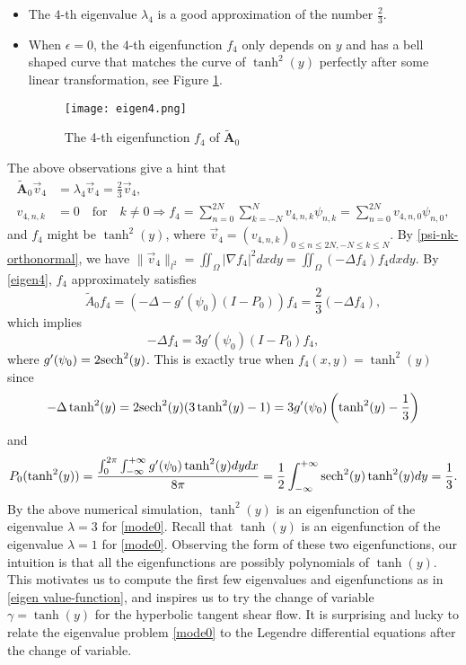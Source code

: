 \documentclass[1 [leqno, 11pt]{amsart}
\numberwithin{equation}{section}
\def\sech{{\rm{sech}}}
\begin{document}
\begin{CJK*}{GBK}{song}
\begin{itemize}
\item The $4$-th eigenvalue $\lambda_4$ is a good approximation of the number $\frac 2 3$.
\item When $\epsilon = 0$, the $4$-th eigenfunction $f_4$ only depends on $y$ and has a bell shaped curve that matches the curve of $\tanh^2(y)$ perfectly after some linear transformation, see Figure \ref{fig:9thFig-co2}.
\begin{figure}[ht]
    \centering
	\texttt{[image: eigen4.png]}
	\caption{The 4-th eigenfunction $f_4$ of $\mathbf{\tilde{A}}_0$}
	\label{fig:9thFig-co2}
\end{figure}
\end{itemize}
The above observations  give a hint that
\begin{align}\label{eigen4}
\mathbf{\tilde{A}}_0 \vec{v}_4& = \lambda_4 \vec{v}_4 =  \frac 2 3 \vec{v}_4,\\\nonumber
v_{4,n,k}&=0\quad\text{for}\quad k\neq0\Longrightarrow
f_4=\sum\limits_{n=0}^{2N}\sum\limits_{k=-N}^Nv_{4,n,k}\psi_{n,k}=\sum\limits_{n=0}^{2N}v_{4,n,0} \psi_{n,0},
\end{align}
and $f_4$ might be $\tanh^2(y)$,
where
$\vec{v}_4=(v_{4,n,k})_{0\leq n\leq 2N,-N\leq k\leq N}$. By \eqref{psi-nk-orthonormal}, we have
$\|\vec{v}_4\|_{l^2}=\iint_{\Omega}|\nabla f_4|^2dxdy=\iint_\Omega(-\Delta f_4)f_4dxdy$.
By \eqref{eigen4}, $f_4$ approximately satisfies  $$\tilde{A}_0 f_4 = (-\Delta - g'(\psi_0)(I-P_0)) f_4 =  \frac 2 3 (-\Delta f_4),$$
which implies
$$-\Delta f_4 = 3g'(\psi_0)(I-P_0)f_4,$$
where $g'(\psi_0) = 2\sech^2(y)$.
This is exactly true when $f_4(x,y) = \tanh^2(y)$ since
$$-\Delta \tanh^2(y) = 2\sech^2(y)(3\tanh^2(y)-1) = 3g'(\psi_0)\left(\tanh^2(y) - \frac 1 3\right)$$
and $$P_0(\tanh^2(y)) = \frac{\int_0^{2\pi} \int_{-\infty}^{+\infty} g'(\psi_0) \tanh^2(y) dydx}{8\pi} = \frac1 2 \int_{-\infty}^{+\infty} \sech^2(y) \tanh^2(y)dy  = \frac 1 3.$$
By the above numerical simulation, $\tanh^2(y)$ is  an eigenfunction of the  eigenvalue $\lambda=3$ for \eqref{mode0}.  Recall that  $\tanh(y)$ is  an eigenfunction of the  eigenvalue $\lambda=1$ for \eqref{mode0}. Observing the form of these two eigenfunctions, our intuition is that all the eigenfunctions are possibly polynomials of $\tanh(y)$. This motivates us to compute
the first few eigenvalues and eigenfunctions as in \eqref{eigen value-function}, and inspires us to try
the change of variable $\gamma=\tanh(y)$ for the hyperbolic tangent shear flow. It is surprising and lucky to relate the eigenvalue problem \eqref{mode0} to the Legendre differential equations after the change of variable.


\end{CJK*}
\end{document}
